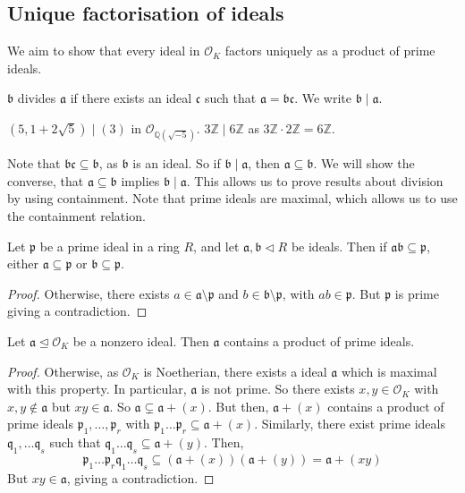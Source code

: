 \subsection{Unique factorisation of ideals}
We aim to show that every ideal in \( \mathcal O_K \) factors uniquely as a product of prime ideals.
\begin{definition}
    \( \mathfrak b \) divides \( \mathfrak a \) if there exists an ideal \( \mathfrak c \) such that \( \mathfrak a = \mathfrak b \mathfrak c \).
    We write \( \mathfrak b \mid \mathfrak a \).
\end{definition}
\begin{example}
    \( (5, 1 + 2\sqrt{5}) \mid (3) \) in \( \mathcal O_{\mathbb Q(\sqrt{-5})} \).
    \( 3\mathbb Z \mid 6\mathbb Z \) as \( 3\mathbb Z \cdot 2\mathbb Z = 6\mathbb Z \).
\end{example}
Note that \( \mathfrak b \mathfrak c \subseteq \mathfrak b \), as \( \mathfrak b \) is an ideal.
So if \( \mathfrak b \mid \mathfrak a \), then \( \mathfrak a \subseteq \mathfrak b \).
We will show the converse, that \( \mathfrak a \subseteq \mathfrak b \) implies \( \mathfrak b \mid \mathfrak a \).
This allows us to prove results about division by using containment.
Note that prime ideals are maximal, which allows us to use the containment relation.
\begin{lemma}
    Let \( \mathfrak p \) be a prime ideal in a ring \( R \), and let \( \mathfrak a, \mathfrak b \triangleleft R \) be ideals.
    Then if \( \mathfrak a \mathfrak b \subseteq \mathfrak p \), either \( \mathfrak a \subseteq \mathfrak p \) or \( \mathfrak b \subseteq \mathfrak p \).
\end{lemma}
\begin{proof}
    Otherwise, there exists \( a \in \mathfrak a \setminus \mathfrak p \) and \( b \in \mathfrak b \setminus \mathfrak p \), with \( ab \in \mathfrak p \).
    But \( \mathfrak p \) is prime giving a contradiction.
\end{proof}
\begin{lemma}
    Let \( \mathfrak a \trianglelefteq \mathcal O_K \) be a nonzero ideal.
    Then \( \mathfrak a \) contains a product of prime ideals.
\end{lemma}
\begin{proof}
    Otherwise, as \( \mathcal O_K \) is Noetherian, there exists a ideal \( \mathfrak a \) which is maximal with this property.
    In particular, \( \mathfrak a \) is not prime.
    So there exists \( x, y \in \mathcal O_K \) with \( x, y \not\in \mathfrak a \) but \( xy \in \mathfrak a \).
    So \( \mathfrak a \subsetneq \mathfrak a + (x) \).
    But then, \( \mathfrak a + (x) \) contains a product of prime ideals \( \mathfrak p_1, \dots, \mathfrak p_r \) with \( \mathfrak p_1\dots \mathfrak p_r \subseteq \mathfrak a + (x) \).
    Similarly,  there exist prime ideals \( \mathfrak q_1, \dots \mathfrak q_s \) such that \( \mathfrak q_1 \dots\mathfrak q_s \subseteq \mathfrak a + (y) \).
    Then,
    \[ \mathfrak p_1\dots \mathfrak p_r\mathfrak q_1 \dots\mathfrak q_s \subseteq (\mathfrak a + (x))(\mathfrak a + (y)) = \mathfrak a + (xy) \]
    But \( xy \in \mathfrak a \), giving a contradiction.
\end{proof}
